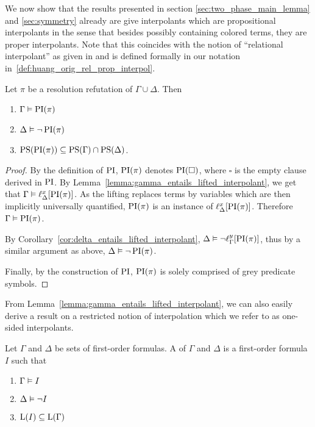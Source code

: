 We now show that the results presented in section \ref{sec:two_phase_main_lemma} and \ref{sec:symmetry}
already are give interpolants which are propositional interpolants in the sense that besides possibly containing colored terms, they are proper interpolants.
Note that this coincides with the notion of ``relational interpolant'' as given in \cite{Huang95} and is defined formally in our notation in~\ref{def:huang_orig_rel_prop_interpol}.

\begin{corr}
	\label{cor:propositional_interpolant}
	Let $\pi$ be a resolution refutation of $\Gamma \cup \Delta$.
	Then
	\begin{enumerate}
		\item$\Gamma\vDash \operatorname{PI}(\pi)$
		\item$\Delta\vDash \lnot \operatorname{PI}(\pi)$
		\item $\operatorname{PS}(\operatorname{PI}(\pi)) \subseteq \operatorname{PS}(\Gamma) \cap \operatorname{PS}(\Delta)$.
	\end{enumerate}
\end{corr}
\begin{proof}
	By the definition of $\operatorname{PI}$, 
	$\operatorname{PI}(\pi)$ denotes $\operatorname{PI}(\square)$, where $\square$ is the empty clause derived in $\operatorname{PI}$.
	By Lemma~\ref{lemma:gamma_entails_lifted_interpolant}, we get that 
	$ \Gamma \vDash \ell_{\Delta}^{x}[\operatorname{PI}(\pi)]$.
	As the lifting replaces terms by variables which are then implicitly universally quantified, $\operatorname{PI}(\pi)$ is an instance of $\ell_{\Delta}^{x}[\operatorname{PI}(\pi)]$.
	Therefore $\Gamma \vDash \operatorname{PI}(\pi)$.

	By Corollary~\ref{cor:delta_entails_lifted_interpolant}, $\Delta \vDash \lnot \ell_{\Gamma}^{y}[\operatorname{PI}(\pi)]$,
	thus by a similar argument as above, $\Delta \vDash \lnot \operatorname{PI}(\pi)$.


	Finally, by the construction of $\operatorname{PI}$, $\operatorname{PI}(\pi)$ is solely comprised of grey predicate symbols.
\end{proof}


From Lemma~\ref{lemma:gamma_entails_lifted_interpolant}, we can also easily derive a result on a restricted notion of interpolation which we refer to as one-sided interpolants. 

\begin{defi}
	Let $\Gamma$ and $\Delta$ be sets of first-order formulas.
	A  of $\Gamma$ and $\Delta$ is a first-order formula $I$ such that
	\begin{enumerate}
		\item $\Gamma \vDash I$
		\item $\Delta \vDash \lnot I$
		\item $\operatorname{L}(I) \subseteq \operatorname{L}(\Gamma) $
			\qedhere
	\end{enumerate}
\end{defi}

